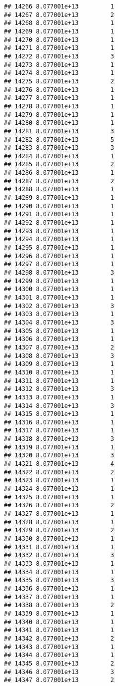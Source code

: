 \documentclass[
]{article}
\begin{document}
\begin{verbatim}
## 14266 8.077001e+13         1
## 14267 8.077001e+13         2
## 14268 8.077001e+13         1
## 14269 8.077001e+13         1
## 14270 8.077001e+13         1
## 14271 8.077001e+13         1
## 14272 8.077001e+13         3
## 14273 8.077001e+13         1
## 14274 8.077001e+13         1
## 14275 8.077001e+13         2
## 14276 8.077001e+13         1
## 14277 8.077001e+13         1
## 14278 8.077001e+13         1
## 14279 8.077001e+13         1
## 14280 8.077001e+13         1
## 14281 8.077001e+13         3
## 14282 8.077001e+13         5
## 14283 8.077001e+13         3
## 14284 8.077001e+13         1
## 14285 8.077001e+13         2
## 14286 8.077001e+13         1
## 14287 8.077001e+13         2
## 14288 8.077001e+13         1
## 14289 8.077001e+13         1
## 14290 8.077001e+13         1
## 14291 8.077001e+13         1
## 14292 8.077001e+13         1
## 14293 8.077001e+13         1
## 14294 8.077001e+13         1
## 14295 8.077001e+13         1
## 14296 8.077001e+13         1
## 14297 8.077001e+13         1
## 14298 8.077001e+13         3
## 14299 8.077001e+13         1
## 14300 8.077001e+13         1
## 14301 8.077001e+13         1
## 14302 8.077001e+13         3
## 14303 8.077001e+13         1
## 14304 8.077001e+13         3
## 14305 8.077001e+13         1
## 14306 8.077001e+13         1
## 14307 8.077001e+13         2
## 14308 8.077001e+13         3
## 14309 8.077001e+13         1
## 14310 8.077001e+13         1
## 14311 8.077001e+13         1
## 14312 8.077001e+13         3
## 14313 8.077001e+13         1
## 14314 8.077001e+13         3
## 14315 8.077001e+13         1
## 14316 8.077001e+13         1
## 14317 8.077001e+13         1
## 14318 8.077001e+13         3
## 14319 8.077001e+13         1
## 14320 8.077001e+13         3
## 14321 8.077001e+13         4
## 14322 8.077001e+13         2
## 14323 8.077001e+13         1
## 14324 8.077001e+13         1
## 14325 8.077001e+13         1
## 14326 8.077001e+13         2
## 14327 8.077001e+13         1
## 14328 8.077001e+13         1
## 14329 8.077001e+13         2
## 14330 8.077001e+13         1
## 14331 8.077001e+13         1
## 14332 8.077001e+13         3
## 14333 8.077001e+13         1
## 14334 8.077001e+13         1
## 14335 8.077001e+13         3
## 14336 8.077001e+13         1
## 14337 8.077001e+13         1
## 14338 8.077001e+13         2
## 14339 8.077001e+13         1
## 14340 8.077001e+13         1
## 14341 8.077001e+13         1
## 14342 8.077001e+13         2
## 14343 8.077001e+13         1
## 14344 8.077001e+13         1
## 14345 8.077001e+13         2
## 14346 8.077001e+13         3
## 14347 8.077001e+13         2

\end{verbatim}
\end{document}
